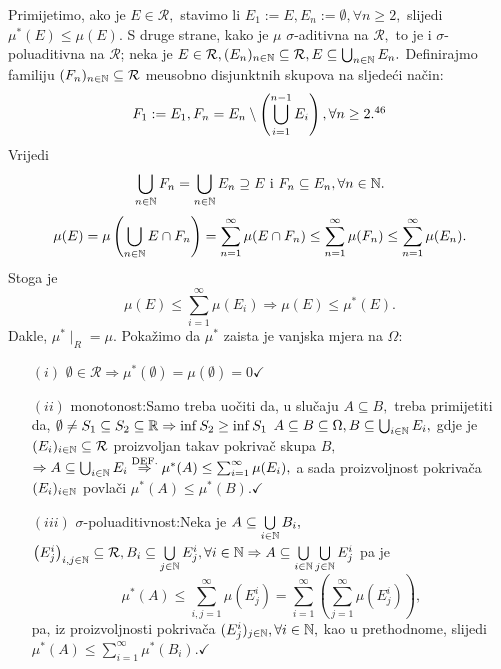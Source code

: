 \documentclass{article}
\begin{document}
Primijetimo, ako je \(E\in\mathcal R,\) stavimo li \(E_1:=E, E_n:=\emptyset,\forall n\ge 2,\) slijedi \(\mu^*(E)\le\mu(E).\) S druge strane, kako je \(\mu\) \(\sigma\)-aditivna na \(\mathcal R,\) to je i \(\sigma\)-poluaditivna na \(\mathcal R\); neka je \(E\in\mathcal R,(E_n)_{n\in\Bbb N}\subseteq\mathcal R, E\subseteq\bigcup_{n\in\Bbb N}E_n.\) Definirajmo familiju \((F_n)_{n\in\Bbb N}\subseteq\mathcal R\) me\dj{}usobno disjunktnih skupova na sljedeći način: \[F_1:=E_1, F_n=E_n\setminus\left(\bigcup_{i=1}^{n-1}E_i\right),\forall n\ge 2.\footnotemark[46]\] Vrijedi \[\bigcup_{n\in\Bbb N}F_n=\bigcup_{n\in\Bbb N}E_n\supseteq E\text{ i }F_n\subseteq E_n,\forall n\in\Bbb N.\] \[\mu(E)=\mu\left(\bigcup_{n\in\Bbb N}E\cap F_n\right)=\sum_{n=1}^\infty\mu(E\cap F_n)\le\sum_{n=1}^\infty\mu(F_n)\le\sum_{n=1}^\infty\mu(E_n).\]  Stoga je \[\mu(E)\le\sum_{i=1}^\infty\mu(E_i)\Rightarrow\mu(E)\le\mu^*(E).\] Dakle, \(\mu^*\mid_R=\mu.\)\newline\newline
Pokažimo da \(\mu^*\) zaista je vanjska mjera na \(\Omega\):
\begin{itemize}
    \item[\((i)\)] \(\emptyset\in\mathcal R\Rightarrow\mu^*(\emptyset)=\mu(\emptyset)=0\checkmark\)
    \item[\((ii)\)] monotonost:\newline Samo treba uočiti da, u slučaju \(A\subseteq B,\) treba primijetiti da, \(\emptyset\ne S_1\subseteq S_2\subseteq\Bbb R\Rightarrow\inf S_2\ge\inf S_1\) \newline \(A\subseteq B\subseteq\Omega, B\subseteq\bigcup_{i\in\Bbb N}E_i,\) gdje je \((E_i)_{i\in\Bbb N}\subseteq\mathcal R\) proizvoljan takav pokrivač skupa \(B,\)\newline \(\Rightarrow A\subseteq\bigcup_{i\in\Bbb N}E_i\overset{\text{DEF.}}{\Rightarrow}\mu^*(A)\le\sum_{i=1}^\infty\mu(E_i),\) a sada proizvoljnost pokrivača \((E_i)_{i\in\Bbb N}\) povlači \newline \(\mu^*(A)\le\mu^*(B).\checkmark\)
    \item[\((iii)\)] \(\sigma\)-poluaditivnost:\newline Neka je \(A\subseteq\bigcup\limits_{i\in\Bbb N}B_i,\) \(\left(E_j^i\right)_{i,j\in\Bbb N}\subseteq\mathcal R, B_i\subseteq\bigcup\limits_{j\in\Bbb N}E_j^i,\forall i\in\Bbb N\Rightarrow A\subseteq\bigcup\limits_{i\in\Bbb N}\bigcup\limits_{j\in\Bbb N}E_j^i\) pa je \[\mu^*(A)\le\sum_{i,j=1}^\infty\mu\left(E_j^i\right)=\sum_{i=1}^\infty\left(\sum_{j=1}^\infty\mu\left(E_j^i\right)\right),\] pa, iz proizvoljnosti pokrivača \((E_j^i)_{j\in\Bbb N},\forall i\in\Bbb N,\) kao u prethodnome, slijedi \(\mu^*(A)\le\sum_{i=1}^\infty\mu^*(B_i).\checkmark\)
\end{itemize}
\end{document}
